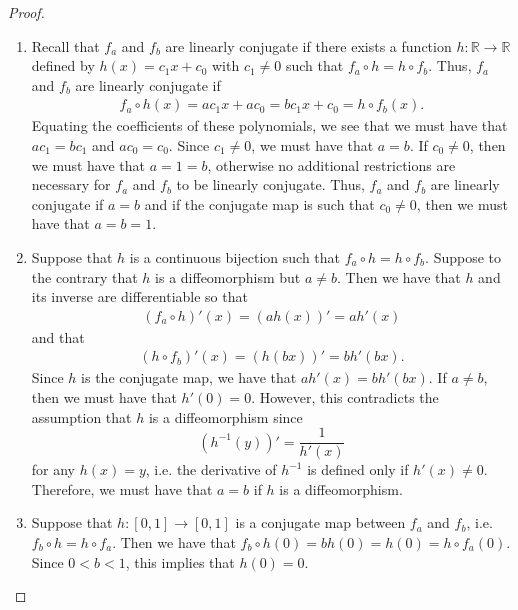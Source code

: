 \begin{proof}
  \begin{enumerate}
    \item Recall that $f_a$ and $f_b$ are linearly conjugate if there exists a function
      $h: \mathbb{R} \to \mathbb{R}$ defined by $h(x) = c_1 x + c_0$ with $c_1 \neq 0$
      such that $f_a \circ h = h \circ f_b$. Thus, $f_a$ and $f_b$ are linearly conjugate
      if
      \begin{align*}
        f_a \circ h (x) = a c_1 x + a c_0 = b c_1 x + c_0 = h \circ f_b (x).
      \end{align*}
      Equating the coefficients of these polynomials, we see that we must have that
      $a c_1 = b c_1$ and $a c_0 = c_0$. Since $c_1 \neq 0$, we must have that $a = b$.
      If $c_0 \neq 0$, then we must have that $a = 1 = b$, otherwise no additional restrictions
      are necessary for $f_a$ and $f_b$ to be linearly conjugate. Thus, $f_a$ and $f_b$ are linearly
      conjugate if $a = b$ and if the conjugate map is such that $c_0 \neq 0$, then
      we must have that $a = b = 1$.

    \item Suppose that $h$ is a continuous bijection such that $f_a \circ h = h \circ f_b$.
      Suppose to the contrary that $h$ is a diffeomorphism but $a \neq b$.
      Then we have that $h$ and its inverse are differentiable so that
      \begin{align*}
        (f_a \circ h)'(x) = (a h(x))' = a h'(x)
      \end{align*}
      and that
      \begin{align*}
        (h \circ f_b)'(x) = (h(bx))' = b h'(bx).
      \end{align*}
      Since $h$ is the conjugate map, we have that $a h'(x) = b h' (bx)$.
      If $a\neq b$, then we must have that $h'(0) = 0$. However,
      this contradicts the assumption that $h$ is a diffeomorphism since
      $$
        \left(h^{-1}(y)\right)' = \frac{1}{h'(x)}
      $$
      for any $h(x)=y$, i.e. the derivative of $h^{-1}$ is defined only if $h'(x) \neq 0$.
      Therefore, we must have that $a=b$ if $h$ is a diffeomorphism.

    \item Suppose that $h: [0, 1] \to [0, 1]$ is a conjugate map between $f_a$ and
      $f_b$, i.e. $f_b \circ h = h \circ f_a$. Then
      we have that $f_b \circ h(0) = b h(0) = h(0) = h \circ f_a(0)$. Since $0 < b < 1$, this implies
      that $h(0) = 0$.


\end{enumerate}
\end{proof}
